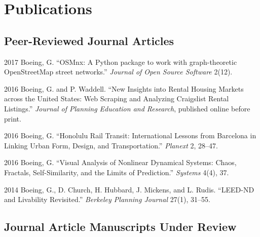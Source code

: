 \documentclass{academiccv}
\begin{document}
\section*{Publications}

\subsection*{Peer-Reviewed Journal Articles}

\begin{tablist}

\item[2017] \tab Boeing, G. \enquote{OSMnx: A Python package to work with graph-theoretic OpenStreetMap street networks.} \emph{Journal of Open Source Software} 2(12).

\item[2016] \tab Boeing, G. and P. Waddell. \enquote{New Insights into Rental Housing Markets across the United States: Web Scraping and Analyzing Craigslist Rental Listings.} \emph{Journal of Planning Education and Research}, published online before print.

\item[2016] \tab Boeing, G. \enquote{Honolulu Rail Transit: International Lessons from Barcelona in Linking Urban Form, Design, and Transportation.} \emph{Planext} 2, 28--47.

\item[2016] \tab Boeing, G. \enquote{Visual Analysis of Nonlinear Dynamical Systems: Chaos, Fractals, Self-Similarity, and the Limits of Prediction.} \emph{Systems} 4(4), 37.

\item[2014] \tab Boeing, G., D. Church, H. Hubbard, J. Mickens, and L. Rudis. \enquote{LEED-ND and Livability Revisited.} \emph{Berkeley Planning Journal} 27(1), 31--55.

\end{tablist}



\subsection*{Journal Article Manuscripts Under Review}
\end{document}
